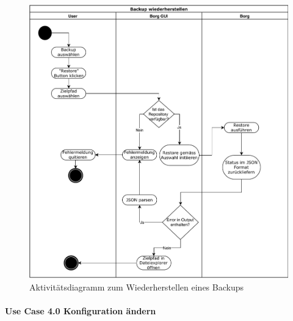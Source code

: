 \begin{figure}[htbp]
\centering
\includegraphics[width=.9\linewidth]{pictures/activity_restore.pdf}
\caption{\label{fig:org613ab2a}
Aktivitätsdiagramm zum Wiederherstellen eines Backups}
\end{figure}

\newpage
\paragraph{Use Case 4.0 Konfiguration ändern}
\label{sec:org43cc091}

